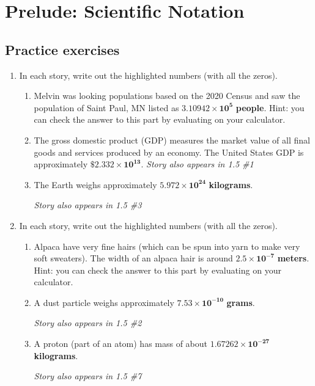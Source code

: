 
\section{Prelude: Scientific Notation} 

\subsection*{Practice exercises}

\begin{enumerate}

\item In each story, write out the highlighted numbers (with all the zeros).
\begin{enumerate}
\item Melvin was looking populations based on the 2020 Census and saw the population of Saint Paul, MN listed as $\mathbf{3.10942 \times 10^{5}}$ \textbf{people}. Hint:  you can check the answer to this part by evaluating on your calculator. \vfill
\item The gross domestic product (GDP) measures the market value of all final goods and services produced by an economy. The United States GDP is approximately $\mathbf{\$2.332 \times 10^{13}}$.
\hfill \emph{Story also appears in 1.5 \#1} \vfill
\item The Earth weighs approximately $\mathbf{5.972 \times 10^{24}}$ \textbf{kilograms}.

\hfill \emph{Story also appears in 1.5 \#3} \vfill
\end{enumerate}

\item In each story, write out the highlighted numbers (with all the zeros).
\begin{enumerate}
\item Alpaca have very fine hairs (which can be spun into yarn to make very soft sweaters).  The width of an alpaca hair is around $\mathbf{2.5 \times 10^{-7}}$ \textbf{meters}. Hint:  you can check the answer to this part by evaluating on your calculator. \vfill
\item A dust particle weighs approximately $\mathbf{7.53 \times 10^{-10}}$ \textbf{grams}.

\hfill \emph{Story also appears in 1.5 \#2} \vfill
\item  A proton (part of an atom) has mass of about $\mathbf{1.67262 \times 10^{-27}}$ \textbf{kilograms}.

\hfill \emph{Story also appears in 1.5 \#7} \vfill
\end{enumerate}


\end{enumerate}
